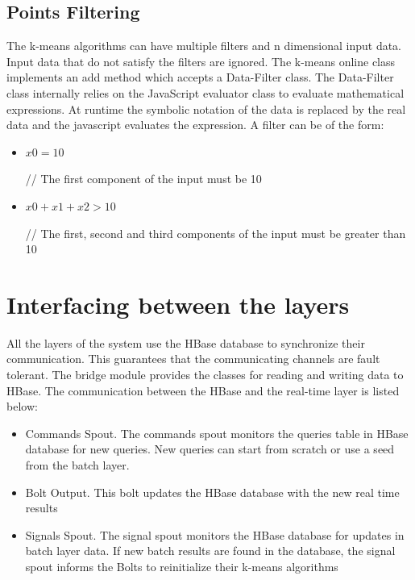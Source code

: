 \documentclass{lmproj}
\begin{document}
\subsection{Points Filtering}

The k-means algorithms can have multiple filters and n dimensional input data. Input data that do not satisfy the filters are ignored. The k-means online class implements an add method which accepts a Data-Filter class. The Data-Filter class internally relies on the JavaScript evaluator class to evaluate mathematical expressions. At runtime the symbolic notation of the data is replaced by the real data and the javascript evaluates the expression. A filter can be of the form:

 \begin{itemize}
 	\item
 	\begin{minipage}[t]{0.3\linewidth}
 		$x0 = 10$
 	\end{minipage}%
 	\begin{minipage}{.7\linewidth}
		// The first component of the input must be 10
 	\end{minipage}
 
 
 	\item
 	\begin{minipage}[t]{0.3\linewidth}
	 	$x0 + x1 + x2 > 10$
 	\end{minipage}%
 	\begin{minipage}{.7\linewidth}
 		// The first, second and third components of the input must be greater than 10
 	\end{minipage}
 \end{itemize}


\section{Interfacing between the layers}

All the layers of the system use the HBase database to synchronize their communication. This guarantees that the communicating channels are fault tolerant. The bridge module provides the classes for reading and writing data to HBase. The communication between the HBase and the real-time layer is listed below:

\begin{itemize}
	\item Commands Spout. The commands spout monitors the queries table in HBase database for new queries.  New queries can start from scratch or use a seed from the batch layer. 
	\item Bolt Output. This bolt updates the HBase database with the new real time results
	\item Signals Spout. The signal spout monitors the HBase database for updates in batch layer data. If new batch results are found in the database, the signal spout informs the Bolts to reinitialize their k-means algorithms 
\end{itemize}
\end{document}

